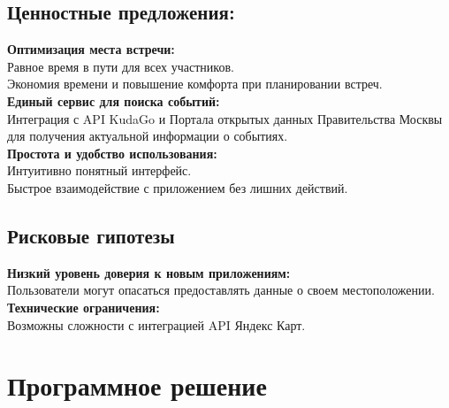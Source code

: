 \documentclass[a4paper,12pt]{extarticle}
\begin{document}
\subsection{Ценностные предложения:}
\noindent
\textbf{Оптимизация места встречи:} \\
Равное время в пути для всех участников.
\\
Экономия времени и повышение комфорта при планировании встреч.
\\
\textbf{Единый сервис для поиска событий:} \\
Интеграция с API KudaGo и Портала открытых данных Правительства Москвы для получения актуальной информации о событиях.
\\
\textbf{Простота и удобство использования:} \\
Интуитивно понятный интерфейс.
\\
Быстрое взаимодействие с приложением без лишних действий.

\subsection{Рисковые гипотезы} 
\noindent
\textbf{Низкий уровень доверия к новым приложениям:} \\
Пользователи могут опасаться предоставлять данные о своем местоположении.
\\
\textbf{Технические ограничения:} \\
Возможны сложности с интеграцией API Яндекс Карт. 

\section{Программное решение}
\end{document}

